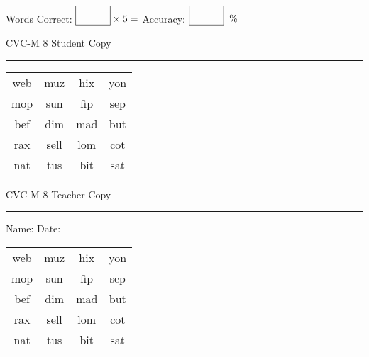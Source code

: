 \documentclass{memoir}
\begin{document}
\small

Words Correct: $\fbox{\phantom{\huge 100}} \times 5 = $ Accuracy: $\fbox{\phantom{\huge 100}}\;\; \%$ 

\vfill

\newpage


\footnotesize \noindent
CVC-M 8 \hfill Student Copy
\smallskip
\hrule

\Large

\setlength{\tabcolsep}{14pt}
\def\arraystretch{2}

{\selectfont


\begin{vplace}[0.5]
\begin{center}
\begin{tabular}{cccc}
web & muz & hix & yon \\
mop & sun & fip & sep \\
bef & dim & mad & but \\
rax & sell & lom & cot \\
nat & tus & bit & sat \\
\end{tabular}
\end{center}
\end{vplace}

}

\newpage

\footnotesize \noindent
CVC-M 8 \hfill Teacher Copy
\smallskip
\hrule

\small

\vfill

\noindent
Name: \underline{\hspace{1.75in}} \hfill Date: \underline{\hspace{1in}}

\Large

{\selectfont


\begin{vplace}[0.5]
\begin{center}
\begin{tabular}{cccc}
web & muz & hix & yon \\
mop & sun & fip & sep \\
bef & dim & mad & but \\
rax & sell & lom & cot \\
nat & tus & bit & sat \\
\end{tabular}
\end{center}
\end{vplace}



}
\end{document}
